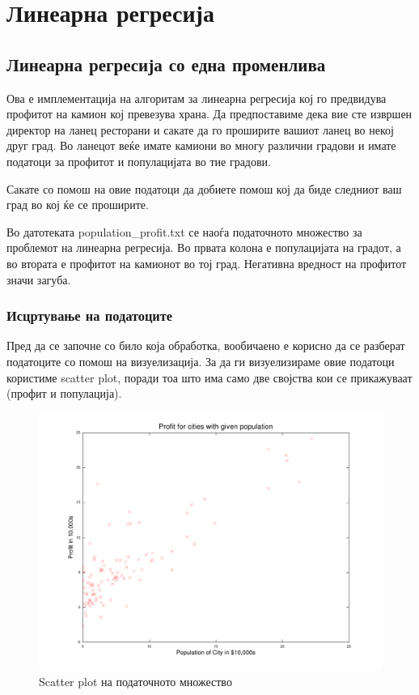 \section{Линеарна регресија}

\subsection{Линеарна регресија со една променлива}
Ова е имплементација на алгоритам за линеарна регресија кој го предвидува
профитот на камион кој превезува храна. Да предпоставиме дека вие сте извршен
директор на ланец ресторани и сакате да го проширите вашиот ланец во некој
друг град. Во ланецот веќе имате камиони во многу различни градови и имате
податоци за профитот и популацијата во тие градови. 

Сакате со помош на овие податоци да добиете помош кој да биде следниот ваш град
во кој ќе се проширите.

Во датотеката population\_profit.txt се наоѓа податочното множество за проблемот
на линеарна регресија. Во првата колона е популацијата на градот, а во втората е
профитот на камионот во тој град. Негативна вредност на профитот значи загуба.

\subsubsection{Исцртување на податоците}

Пред да се започне со било која обработка, вообичаено е корисно да се разберат
податоците со помош на визуелизација. За да ги визуелизираме овие податоци
користиме scatter plot, поради тоа што има само две својства кои се прикажуваат
(профит и популација).








\begin{figure}[htb]
\centering
\includegraphics[width=.9\textwidth]{src/linearRegression/data}
\caption{Scatter plot на податочното множество}
\label{fig:plot}
\end{figure}

